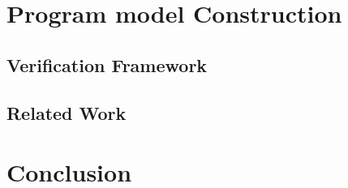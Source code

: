 \documentclass[10pt]{article}
\begin{document}
\section{Program model Construction}
\subsection {Verification Framework}
\subsection {Related Work}
\section{Conclusion}


\end{document}
